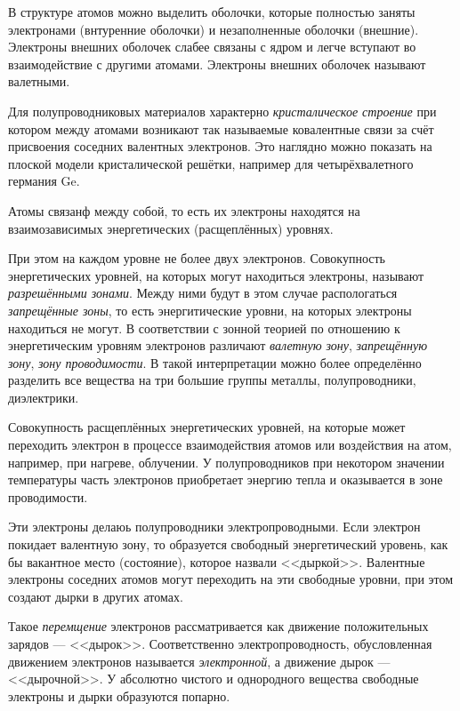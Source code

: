 В структуре атомов можно выделить оболочки, которые полностью заняты электронами
(внтуренние оболочки) и незаполненные оболочки (внешние). Электроны внешних
оболочек слабее связаны с ядром и легче вступают во взаимодействие с другими
атомами. Электроны внешних оболочек называют валетными.

Для полупроводниковых материалов характерно \emph{кристалическое строение} при
котором между атомами возникают так называемые ковалентные связи за счёт
присвоения соседних валентных электронов. Это наглядно можно показать на плоской
модели кристалической решётки, например для четырёхвалетного германия Ge.

Атомы связанф между собой, то есть их электроны находятся на взаимозависимых
энергетических (расщеплённых) уровнях.

При этом на каждом уровне не более двух электронов. Совокупность энергетических
уровней, на которых могут находиться электроны, называют \emph{разрешёнными
	зонами}. Между ними будут в этом случае распологаться \emph{запрещённые зоны},
то есть энергитические уровни, на которых электроны находиться не могут. В
соответствии с зонной теорией по отношению к энергетическим уровням электронов
различают \emph{валетную зону}, \emph{запрещённую зону}, \emph{зону
	проводимости}. В такой интерпретации можно более определённо разделить все
вещества на три большие группы металлы, полупроводники, диэлектрики.

\begin{definition}
	Совокупность расщеплённых энергетических уровней, на которые может переходить
	электрон в процессе взаимодействия атомов или воздействия на атом, например,
	при нагреве, облучении. У полупроводников при некотором значении температуры
	часть электронов приобретает энергию тепла и оказывается в зоне проводимости.
\end{definition}

Эти электроны делаюь полупроводники электропроводными. Если электрон покидает
валентную зону, то образуется свободный энергетический уровень, как бы вакантное
место (состояние), которое назвали <<дыркой>>. Валентные электроны соседних
атомов могут переходить на эти свободные уровни, при этом создают дырки в других
атомах.

Такое \emph{перемщение} электронов рассматривается как движение положительных
зарядов --- <<дырок>>. Соответственно электропроводность, обусловленная
движением электронов называется \emph{электронной}, а движение дырок ---
<<дырочной>>. У абсолютно чистого и однородного вещества свободные электроны и
дырки образуются попарно.

